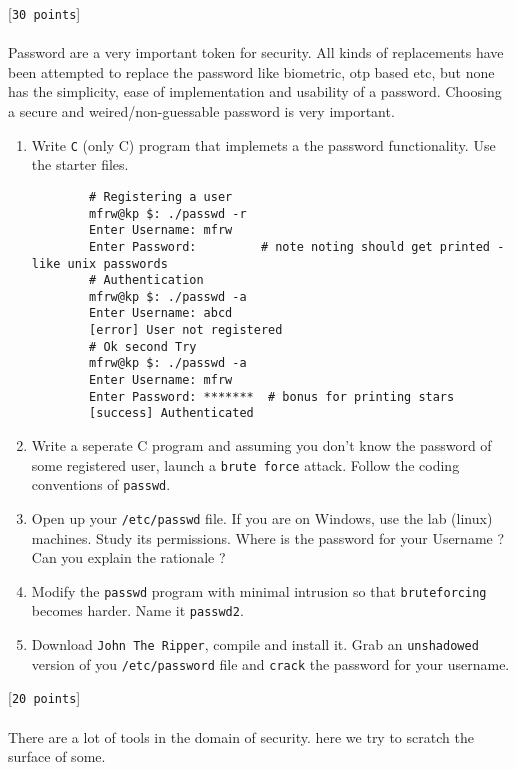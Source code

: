 \documentclass[11pt]{article}
\begin{document}
 [\texttt{30 points}] \\\\
Password are a very important token for security. All kinds of replacements have been attempted to replace the password like biometric, otp based etc, but none has the
simplicity, ease of implementation and usability of a password. Choosing a secure and weired/non-guessable password is very important.
\newpage
\begin{enumerate}
	\item { 
		Write \texttt{C} (only C) program that implemets a the password functionality. Use the starter files.
		\begin{verbatim}
		# Registering a user
		mfrw@kp $: ./passwd -r
		Enter Username: mfrw
		Enter Password:         # note noting should get printed - like unix passwords
		# Authentication
		mfrw@kp $: ./passwd -a
		Enter Username: abcd
		[error] User not registered
		# Ok second Try
		mfrw@kp $: ./passwd -a
		Enter Username: mfrw
		Enter Password: *******  # bonus for printing stars
		[success] Authenticated
		\end{verbatim}
		}
	\item Write a seperate C program and assuming you don't know the password of some registered user, launch a \texttt{brute force} attack. Follow the coding conventions of \texttt{passwd}.
	\item Open up your \texttt{/etc/passwd} file. If you are on Windows, use the lab (linux) machines. Study its permissions. Where is the password for your Username ? Can you explain the rationale ?
	
	\item Modify the \texttt{passwd} program with minimal intrusion so that \texttt{bruteforcing} becomes harder. Name it \texttt{passwd2}.
	
	\item Download \texttt{John The Ripper}, compile and install it. Grab an \texttt{unshadowed} version of you \texttt{/etc/password} file and \texttt{crack} the password for your username.
\end{enumerate}
 [\texttt{20 points}] \\\\
There are a lot of tools in the domain of security. here we try to scratch the surface of some.
\end{document}
